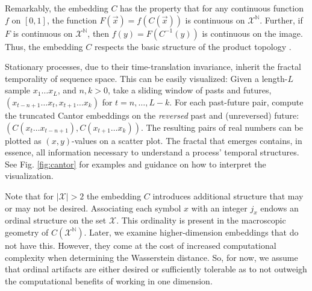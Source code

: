 \documentclass[sigconf, anonymous, review]{acmart}
\begin{document}
Remarkably, the embedding $C$ has the property that for any continuous function
$f$ on $[0,1]$, the function $F(\overrightarrow{x}) = f(C(\overrightarrow{x}))$
is continuous on $\mathcal{X}^\mathbb{N}$. Further, if $F$ is continuous on
$\mathcal{X}^\mathbb{N}$, then $f(y) = F(C^{-1}(y))$ is continuous on the image.
Thus, the embedding $C$ respects the basic structure of the product topology
\cite{Kurk03a}.

Stationary processes, due to their time-translation invariance, inherit the
fractal temporality of sequence space. This can be easily visualized: Given a
length-$L$ sample $x_1\dots x_L$, and $n,k>0$, take a sliding window of pasts
and futures, $(x_{t-n+1}\dots x_t, x_{t+1}\dots x_k)$ for $t=n,\dots,L-k$.  For
each past-future pair, compute the truncated Cantor embeddings on the
\emph{reversed} past and (unreversed) future: $\left(C(x_t \dots
x_{t-n+1}),C(x_{t+1}\dots x_k)\right)$. The resulting pairs of real numbers can
be plotted as $(x,y)$-values on a scatter plot. The fractal that emerges
contains, in essence, all information necessary to understand a process'
temporal structures. See Fig. \ref{fig:cantor} for examples and guidance on how
to interpret the visualization.

Note that for $|\mathcal{X}|>2$ the embedding $C$ introduces additional
structure that may or may not be desired. Associating each symbol $x$ with an
integer $j_x$ endows an ordinal structure on the set $\mathcal{X}$. This
ordinality is present in the macroscopic geometry of
$C\left(\mathcal{X}^{\mathbb{N}}\right)$. Later, we examine higher-dimension
embeddings that do not have this. However, they come at the cost of increased
computational complexity when determining the Wasserstein distance. So, for now,
we assume that ordinal artifacts are either desired or sufficiently tolerable
as to not outweigh the computational benefits of working in one dimension.
\end{document}
